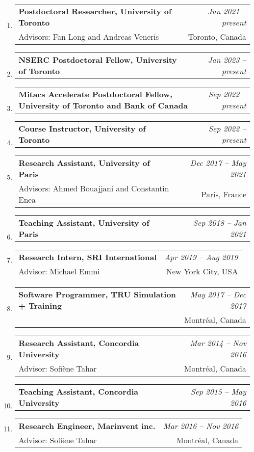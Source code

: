 \documentclass[10pt]{article}
\makeatletter
\newcommand{\lbar}[1]{{\color{#1}\ding{118}}\hspace*{2pt}}
\newenvironment{benumerate}[2]{
    \let\oldItem\item
    \def\item{\addtocounter{enumi}{-2}\oldItem}
    \begin{enumerate}[#2] \itemsep3pt
    \setcounter{enumi}{#1}
    \addtocounter{enumi}{1}}
  {\end{enumerate}}
\newcommand{\positionnodesc}[2]
{%
\item
  \begin{tabular*}{7.5in}{l@{\extracolsep{\fill}}r}
    \textbf{#1} & \textit{#2}
  \end{tabular*}
}
\newenvironment{position}[4]
{%
\item
  \begin{tabular*}{7.5in}{l@{\extracolsep{\fill}}r}
    \textbf{#1} & \textit{#2} \\
    \hspace{1ex} #3 & \small{#4} \\
  \end{tabular*}
  }
  { %
}
\newenvironment{region}[3]{%
  \vspace*{0.5ex}
  {\scalebox{1.4}{\textbf{#1}}}
  \begin{benumerate}{#3}{\color{RoyalBlue}#2}}
  {\end{benumerate}\vspace{0.8ex}}
\newenvironment{nonumregion}[1]{%
\begin{region}{#1}{}{1}}
{\end{region}}
\makeatother
\begin{document}
\begin{nonumregion} {\lbar{orange}Experience}
  \begin{position}{Postdoctoral Researcher, University of Toronto}{Jun 2021 -- present}
		{Advisors: Fan Long and Andreas Veneris}{Toronto, Canada}
  \end{position}
  \positionnodesc{NSERC Postdoctoral Fellow, University of Toronto}{Jan 2023 -- present}
  \positionnodesc{Mitacs Accelerate Postdoctoral Fellow, University of Toronto and Bank of Canada}{Sep 2022 -- present}
  \positionnodesc{Course Instructor, University of Toronto}{Sep 2022 -- present}
  \begin{position}{Research Assistant, University of Paris}{Dec 2017 -- May 2021}
		{Advisors: Ahmed Bouajjani and Constantin Enea}{Paris, France}
  \end{position}
  \positionnodesc{Teaching Assistant, University of Paris}{Sep 2018 -- Jan 2021}
  \begin{position}{Research Intern, SRI International}{Apr 2019 -- Aug 2019}
		{Advisor: Michael Emmi}{New York City, USA}
  \end{position}
  \begin{position}{Software Programmer, TRU Simulation + Training}{May 2017 -- Dec 2017}
      {}{Montr\'{e}al, Canada}
  \end{position}
  \begin{position}{Research Assistant, Concordia University}{Mar 2014 -- Nov 2016}
		{Advisor: Sofi\`{e}ne Tahar}{Montr\'{e}al, Canada}
  \end{position}
  \positionnodesc{Teaching Assistant, Concordia University}{Sep 2015 -- May 2016}
  \begin{position}{Research Engineer, Marinvent inc.}{Mar 2016 -- Nov 2016}
		{Advisor: Sofi\`{e}ne Tahar}{Montr\'{e}al, Canada}
  \end{position}
  

\end{nonumregion}
\end{document}
